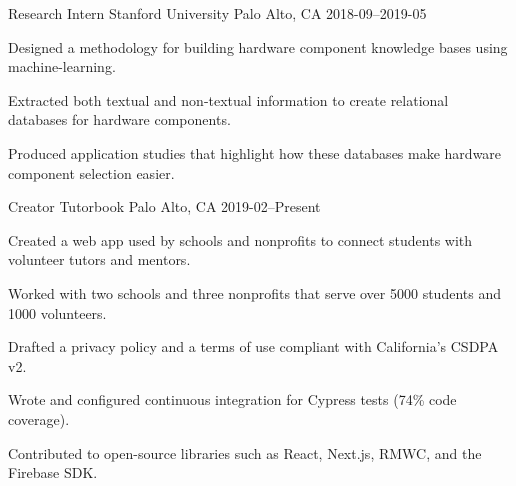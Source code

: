 

\begin{cventries}

  \cventry
    {Research Intern} %
    {Stanford University} %
    {Palo Alto, CA} %
    {2018-09–2019-05} %
    {
      \begin{cvitems} %
        \item {Designed a methodology for building hardware component knowledge bases using machine-learning.}
        \item {Extracted both textual and non-textual information to create relational databases for hardware components.}
        \item {Produced application studies that highlight how these databases make hardware component selection easier.}
      \end{cvitems}
    }

  \cventry
    {Creator} %
    {Tutorbook} %
    {Palo Alto, CA} %
    {2019-02–Present} %
    {
      \begin{cvitems} %
        \item {Created a web app used by schools and nonprofits to connect students with volunteer tutors and mentors.}
        \item {Worked with two schools and three nonprofits that serve over 5000 students and 1000 volunteers.}
        \item {Drafted a privacy policy and a terms of use compliant with California's CSDPA v2.}
        \item {Wrote and configured continuous integration for Cypress tests (74\% code coverage).}
        \item {Contributed to open-source libraries such as React, Next.js, RMWC, and the Firebase SDK.}
      \end{cvitems}
    }


\end{cventries}
